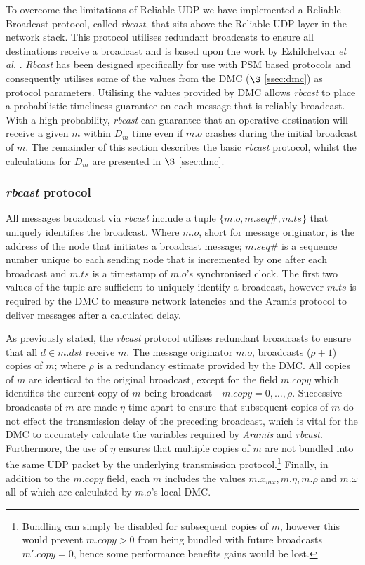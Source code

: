     To overcome the limitations of Reliable UDP we have implemented a Reliable Broadcast protocol, called  \emph{rbcast}, that sits above the Reliable UDP layer in the network stack.  This protocol utilises redundant broadcasts to ensure all destinations receive a broadcast and is based upon the work by  Ezhilchelvan \emph{et al.} \citep{ezhilchelvan2011near}.  \emph{Rbcast} has been designed specifically for use with PSM based protocols and consequently utilises some of the values from the DMC ($\S$ \ref{ssec:dmc}) as protocol parameters.  Utilising the values provided by DMC allows  \emph{rbcast} to place a probabilistic timeliness guarantee on each message that is reliably broadcast.  With a high probability, \emph{rbcast} can guarantee that an operative destination will receive a given $m$ within $D_m$ time even if $m.o$ crashes during the initial broadcast of $m$.  The remainder of this section describes the basic \emph{rbcast} protocol, whilst the calculations for $D_m$ are presented in $\S$ \ref{ssec:dmc}.
    
    \subsubsection*{\emph{rbcast} protocol}
    All messages broadcast via \emph{rbcast} include a tuple $\{m.o, m.seq\#, m.ts\}$ that uniquely identifies the broadcast.  Where $m.o$, short for message originator, is the address of the node that initiates a broadcast message; $m.seq\#$ is a sequence number unique to each sending node that is incremented by one after each broadcast and $m.ts$ is a timestamp of $m.o$'s synchronised clock.  The first two values of the tuple are sufficient to uniquely identify a broadcast, however $m.ts$ is required by the DMC to measure network latencies and the \textsf{Aramis} protocol to deliver messages after a calculated delay.  
    
    As previously stated, the \emph{rbcast} protocol utilises redundant broadcasts to ensure that all $d \in m.dst$ receive $m$.  The message originator $m.o$, broadcasts ($\rho + 1$) copies of $m$; where $\rho$ is a redundancy estimate provided by the DMC.  All copies of $m$ are identical to the original broadcast, except for the field $m.copy$ which identifies the current copy of $m$ being broadcast - $m.copy = 0,\ldots,\rho$.  Successive broadcasts of $m$ are made $\eta$ time apart to ensure that subsequent copies of $m$ do not effect the transmission delay of the preceding broadcast, which is vital for the DMC to accurately calculate the variables required by \emph{Aramis} and \emph{rbcast}.  Furthermore, the use of $\eta$ ensures that multiple copies of $m$ are not bundled into the same UDP packet by the underlying transmission protocol.\footnote{Bundling can simply be disabled for subsequent copies of $m$, however this would prevent $m.copy > 0$ from being bundled with future broadcasts $m'.copy = 0$, hence some performance benefits gains would be lost.}  Finally, in addition to the $m.copy$ field, each $m$ includes the values  $m.x_{mx}, m.\eta, m.\rho$ and $m.\omega$ all of which are calculated by $m.o$'s local DMC.  
    
